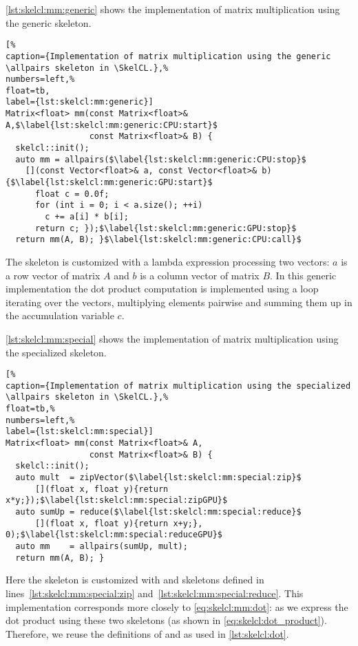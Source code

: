 \autoref{lst:skelcl:mm:generic} shows the implementation of matrix multiplication using the generic \allpairs skeleton.
\begin{lstlisting}[%                                                             
caption={Implementation of matrix multiplication using the generic \allpairs skeleton in \SkelCL.},%
numbers=left,%
float=tb,
label={lst:skelcl:mm:generic}]
Matrix<float> mm(const Matrix<float>& A,$\label{lst:skelcl:mm:generic:CPU:start}$
                 const Matrix<float>& B) {
  skelcl::init();
  auto mm = allpairs($\label{lst:skelcl:mm:generic:CPU:stop}$
    [](const Vector<float>& a, const Vector<float>& b) {$\label{lst:skelcl:mm:generic:GPU:start}$
      float c = 0.0f;
      for (int i = 0; i < a.size(); ++i)
        c += a[i] * b[i];
      return c; });$\label{lst:skelcl:mm:generic:GPU:stop}$
  return mm(A, B); }$\label{lst:skelcl:mm:generic:CPU:call}$
\end{lstlisting}
The skeleton is customized with a lambda expression processing two vectors:
$a$ is a row vector of matrix $A$ and $b$ is a column vector of matrix $B$.
In this generic implementation the dot product computation is implemented using a  loop iterating over the vectors, multiplying elements pairwise and summing them up in the accumulation variable $c$.

\autoref{lst:skelcl:mm:special} shows the implementation of matrix multiplication using the specialized \allpairs skeleton.
\begin{lstlisting}[%                                                             
caption={Implementation of matrix multiplication using the specialized \allpairs skeleton in \SkelCL.},%
float=tb,%                                                                       
numbers=left,%
label={lst:skelcl:mm:special}]
Matrix<float> mm(const Matrix<float>& A,
                 const Matrix<float>& B) {
  skelcl::init();
  auto mult  = zipVector($\label{lst:skelcl:mm:special:zip}$
      [](float x, float y){return x*y;});$\label{lst:skelcl:mm:special:zipGPU}$
  auto sumUp = reduce($\label{lst:skelcl:mm:special:reduce}$
      [](float x, float y){return x+y;}, 0);$\label{lst:skelcl:mm:special:reduceGPU}$
  auto mm    = allpairs(sumUp, mult);
  return mm(A, B); }
\end{lstlisting}
Here the \allpairs skeleton is customized with \zip and \reduce skeletons defined in lines~\ref{lst:skelcl:mm:special:zip} and~\ref{lst:skelcl:mm:special:reduce}.
This implementation corresponds more closely to \autoref{eq:skelcl:mm:dot}:
as we express the dot product using these two skeletons (as shown in \autoref{eq:skelcl:dot_product}).
Therefore, we reuse the definitions of  and  as used in \autoref{lst:skelcl:dot}.

